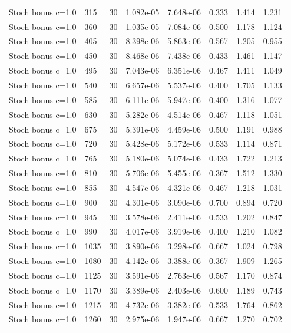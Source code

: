 \begin{scriptsize}
\begin{longtable}{llrrrrrr}
Stoch bonus c=1.0 & 315 & 30 & 1.082e-05 & 7.648e-06 & 0.333 & 1.414 & 1.231 \\
Stoch bonus c=1.0 & 360 & 30 & 1.035e-05 & 7.084e-06 & 0.500 & 1.178 & 1.124 \\
Stoch bonus c=1.0 & 405 & 30 & 8.398e-06 & 5.863e-06 & 0.567 & 1.205 & 0.955 \\
Stoch bonus c=1.0 & 450 & 30 & 8.468e-06 & 7.438e-06 & 0.433 & 1.461 & 1.147 \\
Stoch bonus c=1.0 & 495 & 30 & 7.043e-06 & 6.351e-06 & 0.467 & 1.411 & 1.049 \\
Stoch bonus c=1.0 & 540 & 30 & 6.657e-06 & 5.537e-06 & 0.400 & 1.705 & 1.133 \\
Stoch bonus c=1.0 & 585 & 30 & 6.111e-06 & 5.947e-06 & 0.400 & 1.316 & 1.077 \\
Stoch bonus c=1.0 & 630 & 30 & 5.282e-06 & 4.514e-06 & 0.467 & 1.118 & 1.051 \\
Stoch bonus c=1.0 & 675 & 30 & 5.391e-06 & 4.459e-06 & 0.500 & 1.191 & 0.988 \\
Stoch bonus c=1.0 & 720 & 30 & 5.428e-06 & 5.172e-06 & 0.533 & 1.114 & 0.871 \\
Stoch bonus c=1.0 & 765 & 30 & 5.180e-06 & 5.074e-06 & 0.433 & 1.722 & 1.213 \\
Stoch bonus c=1.0 & 810 & 30 & 5.706e-06 & 5.455e-06 & 0.367 & 1.512 & 1.330 \\
Stoch bonus c=1.0 & 855 & 30 & 4.547e-06 & 4.321e-06 & 0.467 & 1.218 & 1.031 \\
Stoch bonus c=1.0 & 900 & 30 & 4.301e-06 & 3.090e-06 & 0.700 & 0.894 & 0.720 \\
Stoch bonus c=1.0 & 945 & 30 & 3.578e-06 & 2.411e-06 & 0.533 & 1.202 & 0.847 \\
Stoch bonus c=1.0 & 990 & 30 & 4.017e-06 & 3.919e-06 & 0.400 & 1.210 & 1.082 \\
Stoch bonus c=1.0 & 1035 & 30 & 3.890e-06 & 3.298e-06 & 0.667 & 1.024 & 0.798 \\
Stoch bonus c=1.0 & 1080 & 30 & 4.142e-06 & 3.388e-06 & 0.367 & 1.909 & 1.265 \\
Stoch bonus c=1.0 & 1125 & 30 & 3.591e-06 & 2.763e-06 & 0.567 & 1.170 & 0.874 \\
Stoch bonus c=1.0 & 1170 & 30 & 3.389e-06 & 2.403e-06 & 0.600 & 1.189 & 0.743 \\
Stoch bonus c=1.0 & 1215 & 30 & 4.732e-06 & 3.382e-06 & 0.533 & 1.764 & 0.862 \\
Stoch bonus c=1.0 & 1260 & 30 & 2.975e-06 & 1.947e-06 & 0.667 & 1.270 & 0.702 \\

\end{longtable}
\end{scriptsize}
